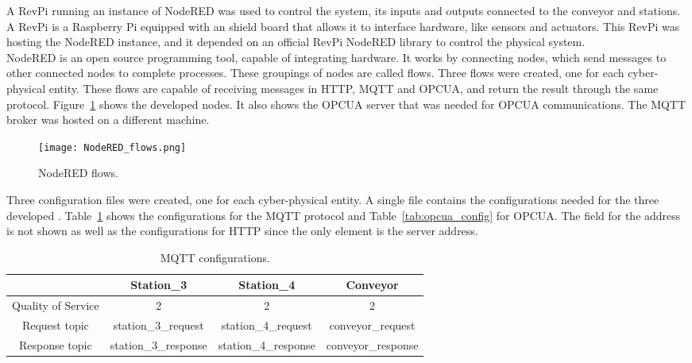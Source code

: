 A RevPi running an instance of NodeRED was used to control the system, its inputs and outputs connected to the conveyor and stations. A RevPi is a Raspberry Pi equipped with an shield board that allows it to interface hardware, like sensors and actuators. This RevPi was hosting the NodeRED instance, and it depended on an official RevPi NodeRED library to control the physical system.\\

NodeRED is an open source programming tool, capable of integrating hardware. It works by connecting nodes, which send messages to other connected nodes to complete processes. These groupings of nodes are called flows. Three flows were created, one for each cyber-physical entity. These flows are capable of receiving messages in \acrshort{HTTP}, \acrshort{MQTT} and \acrshort{OPCUA}, and return the result through the same protocol. Figure~\ref{fig:nodered_flows} shows the developed nodes. It also shows the \acrshort{OPCUA} server that was needed for \acrshort{OPCUA} communications. The \acrshort{MQTT} broker was hosted on a different machine.\\

\begin{figure}[h!]
	\centering
	\texttt{[image: NodeRED\_flows.png]}
	\caption{NodeRED flows.}
	\label{fig:nodered_flows}
\end{figure}

Three configuration files were created, one for each cyber-physical entity. A single file contains the configurations needed for the three developed . Table~\ref{tab:mqtt_config} shows the configurations for the \acrshort{MQTT} protocol and Table~\ref{tab:opcua_config} for \acrshort{OPCUA}. The field for the address is not shown as well as the configurations for \acrshort{HTTP} since the only element is the server address.

\begin{table}[h!]
	\centering
	\caption{\acrshort{MQTT} configurations.}
	\begin{tabular}{c|c|c|c|}
		\cline{2-4}
		& Station\_3                 & Station\_4                 & Conveyor                   \\ \hline
		\multicolumn{1}{|c|}{Quality of Service} & 2                 		& 2                          & 2                          \\ \hline
		\multicolumn{1}{|c|}{Request topic}      & station\_3\_request        & station\_4\_request        & conveyor\_request          \\ \hline
		\multicolumn{1}{|c|}{Response topic}     & station\_3\_response       & station\_4\_response       & conveyor\_response         \\ \hline
	\end{tabular}
	\label{tab:mqtt_config}
\end{table}

